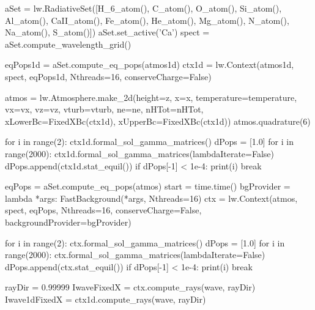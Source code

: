 \begin{pycode}[2DValidation]
aSet = lw.RadiativeSet([H_6_atom(), C_atom(), O_atom(), Si_atom(), Al_atom(), CaII_atom(), Fe_atom(), He_atom(), Mg_atom(), N_atom(), Na_atom(), S_atom()])
aSet.set_active('Ca')
spect = aSet.compute_wavelength_grid()

eqPops1d = aSet.compute_eq_pops(atmos1d)
ctx1d = lw.Context(atmos1d, spect, eqPops1d, Nthreads=16, conserveCharge=False)

atmos = lw.Atmosphere.make_2d(height=z, x=x, temperature=temperature, vx=vx, vz=vz, vturb=vturb, ne=ne, nHTot=nHTot, xLowerBc=FixedXBc(ctx1d), xUpperBc=FixedXBc(ctx1d))
atmos.quadrature(6)


for i in range(2):
    ctx1d.formal_sol_gamma_matrices()
dPops = [1.0]
for i in range(2000):
    ctx1d.formal_sol_gamma_matrices(lambdaIterate=False)
    dPops.append(ctx1d.stat_equil())
    if dPops[-1] < 1e-4:
        print(i)
        break

eqPops = aSet.compute_eq_pops(atmos)
start = time.time()
bgProvider = lambda *args: FastBackground(*args, Nthreads=16)
ctx = lw.Context(atmos, spect, eqPops, Nthreads=16, conserveCharge=False, backgroundProvider=bgProvider)

for i in range(2):
    ctx.formal_sol_gamma_matrices()
dPops = [1.0]
for i in range(2000):
    ctx.formal_sol_gamma_matrices(lambdaIterate=False)
    dPops.append(ctx.stat_equil())
    if dPops[-1] < 1e-4:
        print(i)
        break

rayDir = 0.99999
IwaveFixedX = ctx.compute_rays(wave, rayDir)
Iwave1dFixedX = ctx1d.compute_rays(wave, rayDir)
\end{pycode}


